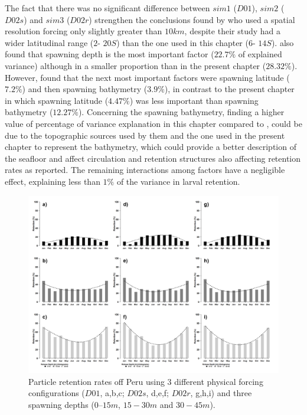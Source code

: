 The fact that there was no significant difference between $sim 1$ ($D01$), $sim 2$ ($D02s$) and $sim 3$ ($D02r$) strengthen the conclusions found by \citep{BrocLett2008} who used a spatial resolution forcing only slightly greater than $10 km$, despite their study had a wider latitudinal range ($2$\textdegree - $20$\textdegree $S$) than the one used in this chapter ($6$\textdegree - $14$\textdegree $S$). \cite{BrocLett2008} also found that spawning depth is the most important factor ($22.7 \%$ of explained variance) although in a smaller proportion than in the present chapter ($28.32 \%$). However, \cite{BrocLett2008} found that the next most important factors were spawning latitude ($7.2 \%$) and then spawning bathymetry ($3.9 \%$), in contrast to the present chapter in which spawning latitude ($4.47 \%$) was less important than spawning bathymetry ($12.27 \%$). Concerning the spawning bathymetry, finding a higher value of percentage of variance explanation in this chapter compared to \cite{BrocLett2008}, could be due to the topographic sources \citep{SmitSand1997} used by them and the one used in the present chapter \citep{BeckSand2009} to represent the bathymetry, which could provide a better description of the seafloor and affect circulation and retention structures also affecting retention rates as \cite{RojaLand2014} reported. The remaining interactions among factors have a negligible effect, explaining less than $1\%$ of the variance in larval retention.\\

\begin{center}
\begin{figure}[H]
	\includegraphics[width=1.0\textwidth]{figures/Chap2Recruitment3sim3depth.png}
	\centering
	\caption{Particle retention rates off Peru using 3 different physical forcing configurations ($D01$, a,b,c; $D02s$, d,e,f; $D02r$, g,h,i) and three spawning depths ($0 – 15 m$, $15 - 30 m$ and $30 - 45 m$).}
	\label{Chap2Recruitment3sim3depth}
\end{figure}
\end{center}

